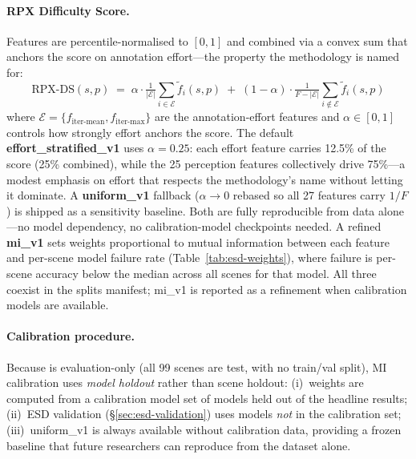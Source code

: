\paragraph{RPX Difficulty Score.}
Features are percentile-normalised to $[0,1]$ and combined via a convex sum that anchors the score on annotation effort---the property the methodology is named for:
\[
\text{RPX-DS}(s,p) \;=\; \alpha \cdot \tfrac{1}{|\mathcal{E}|}\!\!\sum_{i\in\mathcal{E}} \tilde{f}_i(s,p) \;+\; (1-\alpha) \cdot \tfrac{1}{F-|\mathcal{E}|}\!\!\sum_{i\notin\mathcal{E}}\tilde{f}_i(s,p)
\]
where $\mathcal{E} = \{f_{\text{iter-mean}}, f_{\text{iter-max}}\}$ are the annotation-effort features and $\alpha \in [0,1]$ controls how strongly effort anchors the score.
The default \textbf{effort\_stratified\_v1} uses $\alpha = 0.25$: each effort feature carries 12.5\% of the score (25\% combined), while the 25 perception features collectively drive 75\%---a modest emphasis on effort that respects the methodology's name without letting it dominate.
A \textbf{uniform\_v1} fallback ($\alpha \to 0$ rebased so all 27 features carry $1/F$) is shipped as a sensitivity baseline.
Both are fully reproducible from data alone---no model dependency, no calibration-model checkpoints needed.
A refined \textbf{mi\_v1} sets weights proportional to mutual information between each feature and per-scene model failure rate (Table~\ref{tab:esd-weights}), where failure is per-scene accuracy below the median across all scenes for that model.
All three coexist in the splits manifest; mi\_v1 is reported as a refinement when calibration models are available.

\paragraph{Calibration procedure.}
Because \coolname{} is evaluation-only (all 99 scenes are test, with no train/val split), MI calibration uses \textit{model holdout} rather than scene holdout:
(i)~weights are computed from a calibration model set of  models held out of the headline results;
(ii)~ESD validation (\S\ref{sec:esd-validation}) uses models \textit{not} in the calibration set;
(iii)~uniform\_v1 is always available without calibration data, providing a frozen baseline that future researchers can reproduce from the dataset alone.

